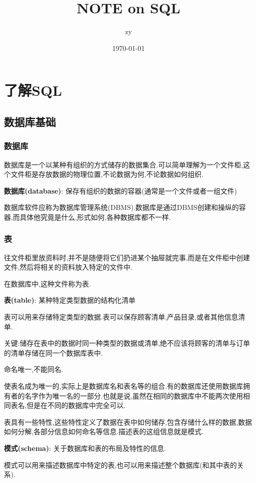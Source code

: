 \documentclass[11pt,a4paper,oneside]{book}
\title{\huge NOTE on SQL}
\author{zy}
\date{\today}
\begin{document}
	\maketitle
	\tableofcontents  %

\chapter{了解SQL}
\section{数据库基础}
\subsection{数据库}
数据库是一个以某种有组织的方式储存的数据集合.可以简单理解为一个文件柜,这个文件柜是存放数据的物理位置,不论数据为何,不论数据如何组织.
\begin{tcolorbox}[colback=blue!7!white,colframe=blue!40]
\textbf{数据库(database)}: 保存有组织的数据的容器(通常是一个文件或者一组文件)
\end{tcolorbox}
\begin{tcolorbox}[colback=pink!10!white,colframe=pink!100!black]
数据库软件应称为数据库管理系统(DBMS).数据库是通过DBMS创建和操纵的容器,而具体他究竟是什么,形式如何,各种数据库都不一样.
\end{tcolorbox}

\subsection{表}
往文件柜里放资料时,并不是随便将它们扔进某个抽屉就完事,而是在文件柜中创建文件,然后将相关的资料放入特定的文件中.

在数据库中,这种文件称为表.
\begin{tcolorbox}[colback=blue!7!white,colframe=blue!40]
\textbf{表(table)}: 某种特定类型数据的结构化清单
\end{tcolorbox}
表可以用来存储特定类型的数据.表可以保存顾客清单,产品目录,或者其他信息清单.

关键:储存在表中的数据时同一种类型的数据或清单,绝不应该将顾客的清单与订单的清单存储在同一个数据库表中.

命名唯一,不能同名.
\begin{tcolorbox}[colback=pink!10!white,colframe=pink!100!black]
使表名成为唯一的,实际上是数据库名和表名等的组合.有的数据库还使用数据库拥有者的名字作为唯一名的一部分.也就是说,虽然在相同的数据库中不能两次使用相同表名,但是在不同的数据库中完全可以.
\end{tcolorbox}
表具有一些特性,这些特性定义了数据在表中如何储存,包含存储什么样的数据,数据如何分解,各部分信息如何命名等信息.描述表的这组信息就是模式.
\begin{tcolorbox}[colback=blue!7!white,colframe=blue!40]
	\textbf{模式(schema)}: 关于数据库和表的布局及特性的信息.
\end{tcolorbox}
模式可以用来描述数据库中特定的表,也可以用来描述整个数据库(和其中表的关系).
\end{document}
